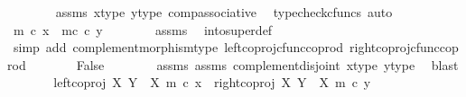 \begin{isabellebody}
\ \ \ \ \ \ \isamarkupfalse%
\ assms\ x{\isacharprime}{\kern0pt}{\isacharunderscore}{\kern0pt}type\ y{\isacharprime}{\kern0pt}{\isacharunderscore}{\kern0pt}type\ comp{\isacharunderscore}{\kern0pt}associative{}\ \isamarkupfalse%
\ {\isacharparenleft}{\kern0pt}typecheck{\isacharunderscore}{\kern0pt}cfuncs{\isacharcomma}{\kern0pt}\ auto{\isacharparenright}{\kern0pt}\isanewline
\ \ \ \ \isamarkupfalse%
\ \isamarkupfalse%
\ {\isachardoublequoteopen}m\ {\isasymcirc}\isactrlsub c\ x{\isacharprime}{\kern0pt}\ {\isacharequal}{\kern0pt}\ m\isactrlsup c\ {\isasymcirc}\isactrlsub c\ y{\isacharprime}{\kern0pt}{\isachardoublequoteclose}\isanewline
\ \ \ \ \ \ \isamarkupfalse%
\ assms\ \isamarkupfalse%
\ into{\isacharunderscore}{\kern0pt}super{\isacharunderscore}{\kern0pt}def\isanewline
\ \ \ \ \ \ \isamarkupfalse%
\ {\isacharparenleft}{\kern0pt}simp\ add{\isacharcolon}{\kern0pt}\ complement{\isacharunderscore}{\kern0pt}morphism{\isacharunderscore}{\kern0pt}type\ left{\isacharunderscore}{\kern0pt}coproj{\isacharunderscore}{\kern0pt}cfunc{\isacharunderscore}{\kern0pt}coprod\ right{\isacharunderscore}{\kern0pt}coproj{\isacharunderscore}{\kern0pt}cfunc{\isacharunderscore}{\kern0pt}coprod{\isacharparenright}{\kern0pt}\isanewline
\ \ \ \ \isamarkupfalse%
\ \isamarkupfalse%
\ False\isanewline
\ \ \ \ \ \ \isamarkupfalse%
\ assms{\isacharparenleft}{\kern0pt}{}{\isacharparenright}{\kern0pt}\ assms{\isacharparenleft}{\kern0pt}{}{\isacharparenright}{\kern0pt}\ complement{\isacharunderscore}{\kern0pt}disjoint\ x{\isacharprime}{\kern0pt}{\isacharunderscore}{\kern0pt}type\ y{\isacharprime}{\kern0pt}{\isacharunderscore}{\kern0pt}type\ \isamarkupfalse%
\ blast\isanewline
\ \ \ \ \isamarkupfalse%
\ \isamarkupfalse%
\ {\isachardoublequoteopen}left{\isacharunderscore}{\kern0pt}coproj\ X\ {\isacharparenleft}{\kern0pt}Y\ {\isasymsetminus}\ {\isacharparenleft}{\kern0pt}X{\isacharcomma}{\kern0pt}\ m{\isacharparenright}{\kern0pt}{\isacharparenright}{\kern0pt}\ {\isasymcirc}\isactrlsub c\ x{\isacharprime}{\kern0pt}\ {\isacharequal}{\kern0pt}\ right{\isacharunderscore}{\kern0pt}coproj\ X\ {\isacharparenleft}{\kern0pt}Y\ {\isasymsetminus}\ {\isacharparenleft}{\kern0pt}X{\isacharcomma}{\kern0pt}\ m{\isacharparenright}{\kern0pt}{\isacharparenright}{\kern0pt}\ {\isasymcirc}\isactrlsub c\ y{\isacharprime}{\kern0pt}{\isachardoublequoteclose}\isanewline

\end{isabellebody}
